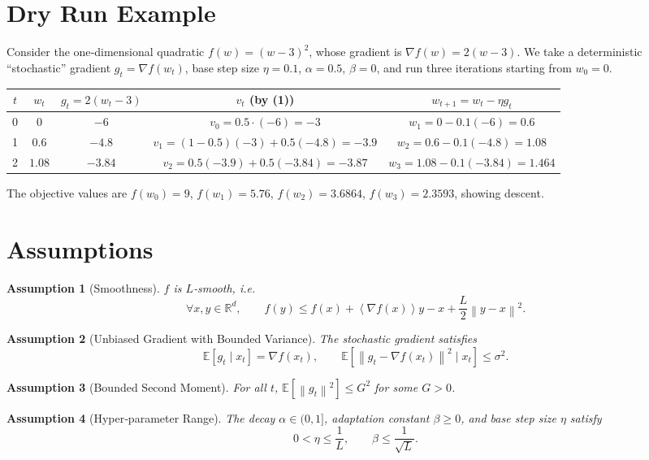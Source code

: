 \documentclass{article}
\newtheorem{assumption}{Assumption}
\newcommand{\EE}{\mathbb{E}}
\newcommand{\RR}{\mathbb{R}}
\newcommand{\norm}[1]{\left\|#1\right\|}
\newcommand{\inner}[1]{\left\langle #1 \right\rangle}
\begin{document}
\section*{Dry Run Example}
Consider the one‑dimensional quadratic $f(w)=(w-3)^2$, whose gradient is $\nabla f(w)=2(w-3)$.  
We take a deterministic “stochastic” gradient $g_t=\nabla f(w_t)$, base step size $\eta=0.1$, 
$\alpha=0.5$, $\beta=0$, and run three iterations starting from $w_0=0$.

\begin{center}
\begin{tabular}{c|c|c|c|c}
$t$ & $w_t$ & $g_t=2(w_t-3)$ & $v_t$ (by (1)) & $w_{t+1}=w_t-\eta g_t$ \\ \hline
0 & $0$ & $-6$ & $v_0=0.5\cdot(-6)=-3$ & $w_1=0-0.1(-6)=0.6$ \\ \hline
1 & $0.6$ & $-4.8$ & $v_1=(1-0.5)(-3)+0.5(-4.8)=-3.9$ & $w_2=0.6-0.1(-4.8)=1.08$ \\ \hline
2 & $1.08$ & $-3.84$ & $v_2=0.5(-3.9)+0.5(-3.84)=-3.87$ & $w_3=1.08-0.1(-3.84)=1.464$ 
\end{tabular}
\end{center}
The objective values are $f(w_0)=9$, $f(w_1)=5.76$, $f(w_2)=3.6864$, $f(w_3)=2.3593$, showing descent.

\newpage

\section*{Assumptions}
\begin{assumption}[Smoothness]\label{ass:smooth}
$f$ is $L$‑smooth, i.e.
\[
\forall x,y\in\RR^d,\qquad 
f(y)\le f(x)+\inner{\nabla f(x)}{y-x}+\frac{L}{2}\norm{y-x}^2 .
\]
\end{assumption}
\begin{assumption}[Unbiased Gradient with Bounded Variance]\label{ass:grad}
The stochastic gradient satisfies
\[
\EE\!\left[g_t\mid x_t\right]=\nabla f(x_t),\qquad
\EE\!\left[\norm{g_t-\nabla f(x_t)}^2\mid x_t\right]\le\sigma^2 .
\]
\end{assumption}
\begin{assumption}[Bounded Second Moment]\label{ass:bound}
For all $t$, $\EE\!\left[\norm{g_t}^2\right]\le G^2$ for some $G>0$.
\end{assumption}
\begin{assumption}[Hyper‑parameter Range]\label{ass:hyper}
The decay $\alpha\in(0,1]$, adaptation constant $\beta\ge0$, and base step size $\eta$ satisfy
\[
0<\eta\le \frac{1}{L},\qquad \beta\le \frac{1}{\sqrt{L}} .
\]
\end{assumption}
\end{document}

